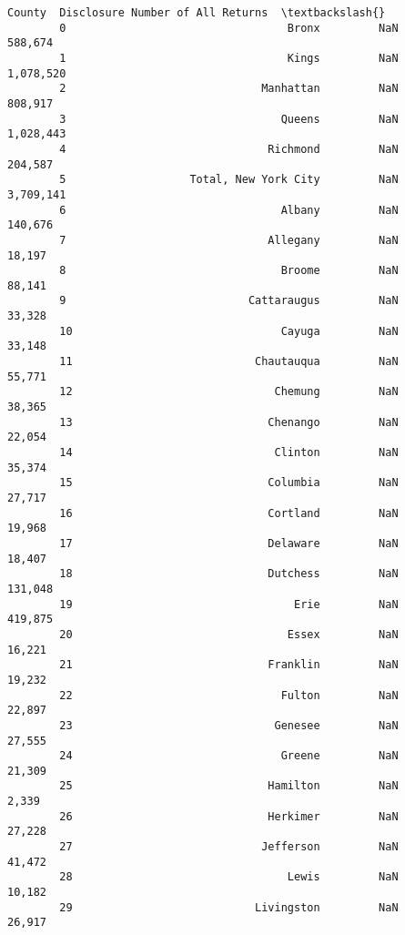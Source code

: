 \documentclass[11pt]{article}
\begin{document}
\begin{Verbatim}[commandchars=\\\{\}]
                                          County  Disclosure Number of All Returns  \textbackslash{}
        0                                  Bronx         NaN               588,674   
        1                                  Kings         NaN             1,078,520   
        2                              Manhattan         NaN               808,917   
        3                                 Queens         NaN             1,028,443   
        4                               Richmond         NaN               204,587   
        5                   Total, New York City         NaN             3,709,141   
        6                                 Albany         NaN               140,676   
        7                               Allegany         NaN                18,197   
        8                                 Broome         NaN                88,141   
        9                            Cattaraugus         NaN                33,328   
        10                                Cayuga         NaN                33,148   
        11                            Chautauqua         NaN                55,771   
        12                               Chemung         NaN                38,365   
        13                              Chenango         NaN                22,054   
        14                               Clinton         NaN                35,374   
        15                              Columbia         NaN                27,717   
        16                              Cortland         NaN                19,968   
        17                              Delaware         NaN                18,407   
        18                              Dutchess         NaN               131,048   
        19                                  Erie         NaN               419,875   
        20                                 Essex         NaN                16,221   
        21                              Franklin         NaN                19,232   
        22                                Fulton         NaN                22,897   
        23                               Genesee         NaN                27,555   
        24                                Greene         NaN                21,309   
        25                              Hamilton         NaN                 2,339   
        26                              Herkimer         NaN                27,228   
        27                             Jefferson         NaN                41,472   
        28                                 Lewis         NaN                10,182   
        29                            Livingston         NaN                26,917   

\end{Verbatim}
\end{document}
